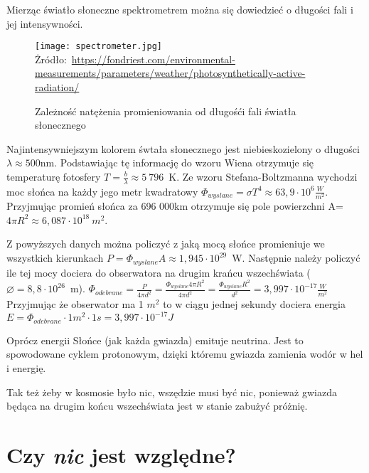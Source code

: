 \documentclass{article}
\begin{document}
Mierząc światło słoneczne spektrometrem można się dowiedzieć o długości fali i jej intensywności.

\begin{figure}[H]
	\centering
	\caption{Zależność natężenia promieniowania od długośći fali światła słonecznego}
	\texttt{[image: spectrometer.jpg]}
	{\tiny Żródło:~\url{https://fondriest.com/environmental-measurements/parameters/weather/photosynthetically-active-radiation/}}
\end{figure}

Najintensywniejszym kolorem śwtała słonecznego jest niebieskozielony o długości $\lambda \approx 500$nm.
Podstawiając tę informację do wzoru Wiena otrzymuje się temperaturę fotosfery $T=\frac{b}{\lambda}\approx 5~796$~K.
Ze wzoru Stefana-Boltzmanna wychodzi moc słońca na każdy jego metr kwadratowy $\Phi_{wyslane}=\sigma T^4\approx 63,9 \cdot 10^{6}\frac{W}{m^2}$.
Przyjmując promień słońca za 696 000km otrzymuje się pole powierzchni A=$4\pi R^2\approx 6,087\cdot 10^{18}~m^2$.

Z powyższych danych można policzyć z jaką mocą słońce promieniuje we wszystkich kierunkach $P=\Phi_{wyslane} A\approx 1,945\cdot 10^{29}$~W.
Następnie należy policzyć ile tej mocy dociera do obserwatora na drugim krańcu wszechświata ($\diameter =8,8\cdot 10^{26}$~m).
$\Phi_{odebrane}=\frac{P}{4\pi d^2}=\frac{\Phi_{wyslane} 4\pi R^2}{4\pi d^2}=\frac{\Phi_{wyslane} R^2}{d^2}=3,997\cdot 10^{-17} \frac{W}{m^2}$
Przyjmując że obserwator ma 1 $m^2$ to w ciągu jednej sekundy dociera energia $E=\Phi_{odebrane}\cdot 1 m^2 \cdot 1s=3,997\cdot 10^{-17} J$

Oprócz energii Słońce (jak każda gwiazda) emituje neutrina. Jest to spowodowane cyklem protonowym,
dzięki któremu gwiazda zamienia wodór w hel i energię.

Tak też żeby w kosmosie było nic, wszędzie musi być nic, ponieważ gwiazda będąca na drugim końcu wszechświata jest w stanie zabużyć próżnię.

\section{Czy \textit{nic} jest względne?}
\end{document}
